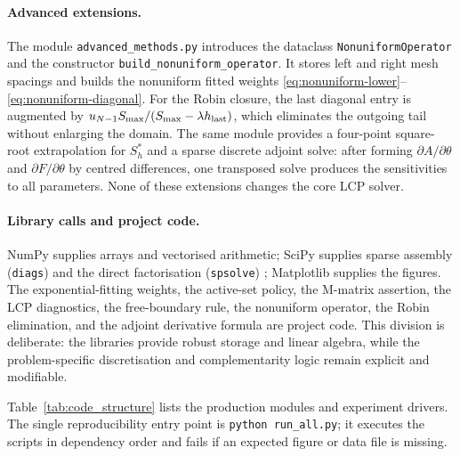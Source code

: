 \documentclass[11pt,a4paper]{article}
\theoremstyle{definition}
\theoremstyle{remark}
\begin{document}
\paragraph{Advanced extensions.}
The module \texttt{advanced\_methods.py} introduces the dataclass
\texttt{NonuniformOperator} and the constructor
\texttt{build\_nonuniform\_operator}. It stores left and right mesh spacings
and builds the nonuniform fitted weights
\eqref{eq:nonuniform-lower}--\eqref{eq:nonuniform-diagonal}. For the Robin
closure, the last diagonal entry is augmented by
$u_{N-1}S_{\max}/(S_{\max}-\lambda h_{\rm last})$, which eliminates the
outgoing tail without enlarging the domain. The same module provides a
four-point square-root extrapolation for $S_h^*$ and a sparse discrete
adjoint solve: after forming $\partial A/\partial\theta$ and
$\partial F/\partial\theta$ by centred differences, one transposed solve
produces the sensitivities to all parameters. None of these extensions
changes the core LCP solver.

\paragraph{Library calls and project code.}
NumPy supplies arrays and vectorised arithmetic; SciPy supplies sparse
assembly (\texttt{diags}) and the direct factorisation (\texttt{spsolve})
\cite{ref5}; Matplotlib supplies the figures. The exponential-fitting weights, the
active-set policy, the M-matrix assertion, the LCP diagnostics, the
free-boundary rule, the nonuniform operator, the Robin elimination, and the
adjoint derivative formula are project code. This division is deliberate:
the libraries provide robust storage and linear algebra, while the
problem-specific discretisation and complementarity logic remain explicit
and modifiable.

Table~\ref{tab:code_structure} lists the production modules and experiment
drivers. The single reproducibility entry point is
\texttt{python run\_all.py}; it executes the scripts in dependency order and
fails if an expected figure or data file is missing.
\end{document}
